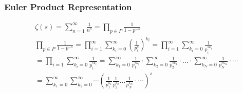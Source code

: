 	\subsubsection{Euler Product Representation}
	
	$$
	\begin{aligned}
		& \zeta(s)=\sum_{n=1}^{\infty} \frac{1}{n^s}=\prod_{p \in P} \frac{1}{1-p^{-s}} \\
		& \prod_{p \in P} \frac{1}{1-p^{-s}}=\prod_{i=1}^{\infty} \sum_{k_i=0}^{\infty}\left(\frac{1}{p_i^s}\right)^{k_i}=\prod_{i=1}^{\infty} \sum_{k_i=0}^{\infty} \frac{1}{p_i^{s k_i}} \\
		& =\prod_{i=1} \sum_{k_i=0}^{\infty} \frac{1}{p_i^{s k_i}}=\sum_{k_1=0}^{\infty} \frac{1}{p_1^{s k_1}} \cdot \sum_{k_2=0}^{\infty} \frac{1}{p_2^{s k_2}} \cdot \ldots \cdot \sum_{k_N=0}^{\infty} \frac{1}{p_N^{s k_N}} \cdot \cdots \\
		& =\sum_{k_1=0}^{\infty} \sum_{k_2=0}^{\infty} \cdots\left(\frac{1}{p_1^{k_1}} \frac{1}{p_2^{k_2}} \ldots \frac{1}{p_N^{k_N}} \cdot \cdots\right)^s
	\end{aligned}
	$$
	

